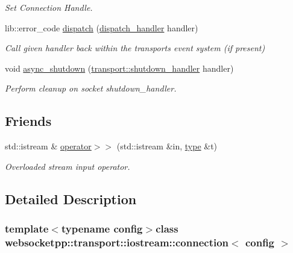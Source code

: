 \begin{DoxyCompactItemize}
\begin{DoxyCompactList}\small\item\em Set Connection Handle. \end{DoxyCompactList}\item 
lib\+::error\+\_\+code \hyperlink{classwebsocketpp_1_1transport_1_1iostream_1_1connection_a0c31a1546701021f547ae2f21126a473}{dispatch} (\hyperlink{namespacewebsocketpp_1_1transport_a6658447b2e10f4c712dd792aad0e0c78}{dispatch\+\_\+handler} handler)
\begin{DoxyCompactList}\small\item\em Call given handler back within the transport\textquotesingle{}s event system (if present) \end{DoxyCompactList}\item 
void \hyperlink{classwebsocketpp_1_1transport_1_1iostream_1_1connection_a2db617fadc96d53034eae1d0f3f1a68a}{async\+\_\+shutdown} (\hyperlink{namespacewebsocketpp_1_1transport_af39aff6fc4cb76f7df0d5322b734d156}{transport\+::shutdown\+\_\+handler} handler)
\begin{DoxyCompactList}\small\item\em Perform cleanup on socket shutdown\+\_\+handler. \end{DoxyCompactList}\end{DoxyCompactItemize}
\subsection*{Friends}
\begin{DoxyCompactItemize}
\item 
std\+::istream \& \hyperlink{classwebsocketpp_1_1transport_1_1iostream_1_1connection_abe774d57c24627dd991932f833041987}{operator$>$$>$} (std\+::istream \&in, \hyperlink{classwebsocketpp_1_1transport_1_1iostream_1_1connection_a39c8ef910236a223be66a8338962cb99}{type} \&t)
\begin{DoxyCompactList}\small\item\em Overloaded stream input operator. \end{DoxyCompactList}\end{DoxyCompactItemize}


\subsection{Detailed Description}
\subsubsection*{template$<$typename config$>$class websocketpp\+::transport\+::iostream\+::connection$<$ config $>$}



